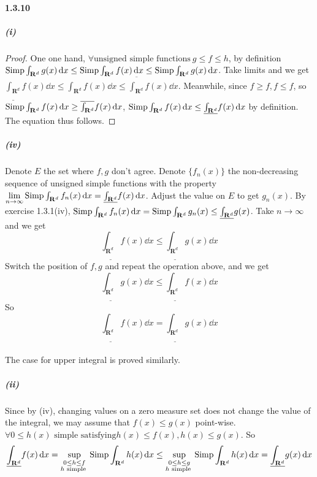 \documentclass{article}
\begin{document}
\paragraph{1.3.10}

\subparagraph{(i)}
\begin{proof}
One one hand, $\forall\text{unsigned simple functions}\  g\leq f\leq h$, by definition $\mathrm{Simp}\int_{\mathbf{R}^d}g(x)\,\mathrm{d} x \leq \mathrm{Simp}\int_{\mathbf{R}^d}f(x)\,\mathrm{d} x\leq \mathrm{Simp}\int_{\mathbf{R}^d}g(x)\,\mathrm{d} x$. Take limits and we get $\underline{\int_{\mathbf{R}^d}}f(x)\dd x\leq\int_{\mathbf{R}^d}f(x)\dd x\leq \overline{\int_{\mathbf{R}^d}}f(x)\dd x$. Meanwhile, since $f\geq f,f\leq f$, so $\mathrm{Simp}\int_{\mathbf{R}^d}f(x)\,\mathrm{d} x\geq \overline{\int_{\mathbf{R}^d}}f(x)\,\mathrm{d} x$, $\mathrm{Simp}\int_{\mathbf{R}^d}f(x)\,\mathrm{d} x\leq \underline{\int_{\mathbf{R}^d}}f(x)\,\mathrm{d} x$ by definition. The equation thus follows.
\end{proof}
\subparagraph{(iv)}
Denote $E$ the set where $f,g$ don't agree. Denote $\{f_n(x)\}$ the non-decreasing sequence of unsigned simple functions with the property $\lim\limits_{n\to\infty}\mathrm{Simp}\int_{\mathbf{R}^d}f_n(x)\,\mathrm{d} x=\underline{\int_{\mathbf{R}^d}}f(x)\,\mathrm{d} x$. Adjust the value on $E$ to get $g_n(x)$. By exercise 1.3.1(iv), $\mathrm{Simp}\int_{\mathbf{R}^d}f_n(x)\,\mathrm{d} x=\mathrm{Simp}\int_{\mathbf{R}^d}g_n(x)\leq \underline{\int_{\mathbf{R}^d}}g(x)$. Take $n\to\infty$ and we get 
\[\underline{\int_{\mathbf{R}^d}}f(x)\dd x\leq\underline{\int_{\mathbf{R}^d}}g(x)\dd x\]
Switch the position of $f,g$ and repeat the operation above, and we get 
\[\underline{\int_{\mathbf{R}^d}}g(x)\dd x\leq\underline{\int_{\mathbf{R}^d}}f(x)\dd x\]
So
\[\underline{\int_{\mathbf{R}^d}}f(x)\dd x=\underline{\int_{\mathbf{R}^d}}g(x)\dd x\]\\
The case for upper integral is proved similarly.
\subparagraph{(ii)}
Since by (iv), changing values on a zero measure set does not change the value of the integral, we may assume that $f(x)\leq g(x)$ point-wise. \\
$\forall 0\leq h(x)\text{ simple satisfying}h(x)\leq f(x), h(x)\leq g(x)$. So
\[\underline{\int_{\mathbf{R}^d}}f(x)\,\mathrm{d} x=\sup_{\substack{0\leq h\leq f\\h\text{ simple }}}\mathrm{Simp}\int_{\mathbf{R}^d}h(x)\,\mathrm{d} x\leq \sup_{\substack{0\leq h\leq g\\h\text{ simple }}}\mathrm{Simp}\int_{\mathbf{R}^d}h(x)\,\mathrm{d} x=\underline{\int_{\mathbf{R}^d}}g(x)\,\mathrm{d} x\] 
\end{document}
